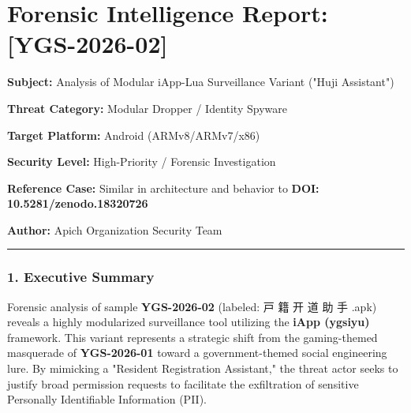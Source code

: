 \documentclass[
]{article}
\author{}
\date{}
\begin{document}
\section{\texorpdfstring{\textbf{Forensic Intelligence Report:
{[}YGS-2026-02{]}}}{Forensic Intelligence Report: {[}YGS-2026-02{]}}}\label{forensic-intelligence-report-ygs-2026-02}

\textbf{Subject:} Analysis of Modular iApp-Lua Surveillance Variant
("Huji Assistant")

\textbf{Threat Category:} Modular Dropper / Identity Spyware

\textbf{Target Platform:} Android (ARMv8/ARMv7/x86)

\textbf{Security Level:} High-Priority / Forensic Investigation

\textbf{Reference Case:} Similar in architecture and behavior to
\textbf{DOI: 10.5281/zenodo.18320726}

\textbf{Author:} Apich Organization Security Team

\begin{center}\rule{0.5\linewidth}{0.5pt}\end{center}

\subsubsection{\texorpdfstring{\textbf{1. Executive
Summary}}{1. Executive Summary}}\label{1-executive-summary}

Forensic analysis of sample \textbf{YGS-2026-02} (labeled: 戸 籍 开 道
助 手 .apk) reveals a highly modularized surveillance tool utilizing the
\textbf{iApp (ygsiyu)} framework. This variant represents a strategic
shift from the gaming-themed masquerade of \textbf{YGS-2026-01} toward a
government-themed social engineering lure. By mimicking a "Resident
Registration Assistant," the threat actor seeks to justify broad
permission requests to facilitate the exfiltration of sensitive
Personally Identifiable Information (PII).
\end{document}
